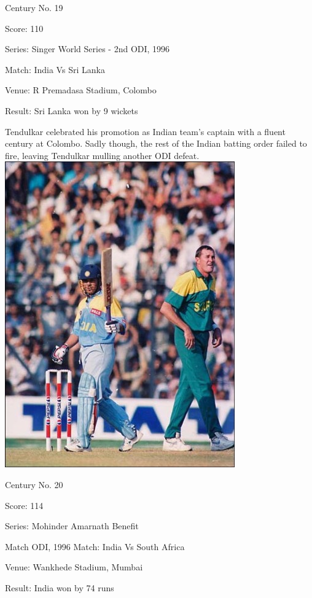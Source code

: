 \documentclass[11pt, a4paper]{article}
\begin{document}
Century No. 19 

Score: 110 

Series: Singer World Series - 2nd ODI, 1996 

Match: India Vs Sri Lanka 

Venue: R Premadasa Stadium, Colombo 

Result: Sri Lanka won by 9 wickets 

Tendulkar celebrated his promotion as Indian team's captain with a fluent century at Colombo. Sadly though, the rest of the Indian batting order failed to fire, leaving Tendulkar mulling another ODI defeat.
\newpage
\includegraphics[height=0.8\textheight]{pics/20.jpg}

Century No. 20 

Score: 114 

Series: Mohinder Amarnath Benefit 

Match ODI, 1996 Match: India Vs South Africa 

Venue: Wankhede Stadium, Mumbai 

Result: India won by 74 runs 
\end{document}

